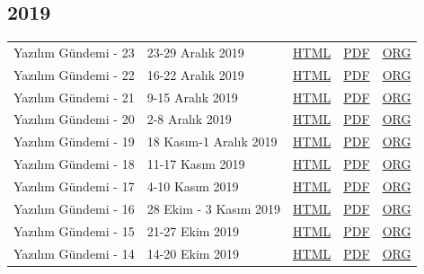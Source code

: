 \documentclass[11pt]{article}
\begin{document}
\subsection*{2019}
\label{sec:orgc5d7549}
\begin{center}
\begin{tabular}{lllll}
\hline
Yazılım Gündemi - 23 & 23-29 Aralık 2019 & \href{arsiv/2019/23/yazilim-gundemi-23.html}{HTML} & \href{arsiv/2019/23/yazilim-gundemi-23.pdf}{PDF} & \href{arsiv/2019/23/yazilim-gundemi-23.pdf}{ORG}\\
Yazılım Gündemi - 22 & 16-22 Aralık 2019 & \href{arsiv/2019/22/yazilim-gundemi-22.html}{HTML} & \href{arsiv/2019/22/yazilim-gundemi-22.pdf}{PDF} & \href{arsiv/2019/22/yazilim-gundemi-22.pdf}{ORG}\\
Yazılım Gündemi - 21 & 9-15 Aralık 2019 & \href{arsiv/2019/21/yazilim-gundemi-21.html}{HTML} & \href{arsiv/2019/21/yazilim-gundemi-21.pdf}{PDF} & \href{arsiv/2019/21/yazilim-gundemi-21.pdf}{ORG}\\
Yazılım Gündemi - 20 & 2-8 Aralık 2019 & \href{arsiv/2019/20/yazilim-gundemi-20.html}{HTML} & \href{arsiv/2019/20/yazilim-gundemi-20.pdf}{PDF} & \href{arsiv/2019/20/yazilim-gundemi-20.pdf}{ORG}\\
Yazılım Gündemi - 19 & 18 Kasım-1 Aralık 2019 & \href{arsiv/2019/19/yazilim-gundemi-19.html}{HTML} & \href{arsiv/2019/19/yazilim-gundemi-19.pdf}{PDF} & \href{arsiv/2019/19/yazilim-gundemi-19.pdf}{ORG}\\
Yazılım Gündemi - 18 & 11-17 Kasım 2019 & \href{arsiv/2019/18/yazilim-gundemi-18.html}{HTML} & \href{arsiv/2019/18/yazilim-gundemi-18.pdf}{PDF} & \href{arsiv/2019/18/yazilim-gundemi-18.pdf}{ORG}\\
Yazılım Gündemi - 17 & 4-10 Kasım 2019 & \href{arsiv/2019/17/yazilim-gundemi-17.html}{HTML} & \href{arsiv/2019/17/yazilim-gundemi-17.pdf}{PDF} & \href{arsiv/2019/17/yazilim-gundemi-17.pdf}{ORG}\\
Yazılım Gündemi - 16 & 28 Ekim - 3 Kasım 2019 & \href{arsiv/2019/16/yazilim-gundemi-16.html}{HTML} & \href{arsiv/2019/16/yazilim-gundemi-16.pdf}{PDF} & \href{arsiv/2019/16/yazilim-gundemi-16.pdf}{ORG}\\
Yazılım Gündemi - 15 & 21-27 Ekim 2019 & \href{arsiv/2019/15/yazilim-gundemi-15.html}{HTML} & \href{arsiv/2019/15/yazilim-gundemi-15.pdf}{PDF} & \href{arsiv/2019/15/yazilim-gundemi-15.pdf}{ORG}\\
Yazılım Gündemi - 14 & 14-20 Ekim 2019 & \href{arsiv/2019/14/yazilim-gundemi-14.html}{HTML} & \href{arsiv/2019/14/yazilim-gundemi-14.pdf}{PDF} & \href{arsiv/2019/14/yazilim-gundemi-14.pdf}{ORG}\\

\end{tabular}
\end{center}
\end{document}

